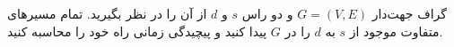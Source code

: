 گراف جهت‌دار $G = (V, E)$ و دو راس $s$ و $d$ از آن را در نظر بگیرید. تمام مسیرهای متفاوت موجود از $s$ به $d$ را در $G$ پیدا کنید و پیچیدگی زمانی راه خود را محاسبه کنید.
